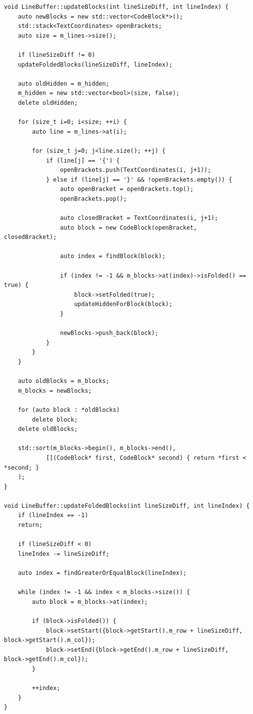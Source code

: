 \documentclass[12pt,oneside]{memoir}
\begin{document}
\begin{verbatim}
void LineBuffer::updateBlocks(int lineSizeDiff, int lineIndex) {
	auto newBlocks = new std::vector<CodeBlock*>();
	std::stack<TextCoordinates> openBrackets;
	auto size = m_lines->size();
	
	if (lineSizeDiff != 0)
	updateFoldedBlocks(lineSizeDiff, lineIndex);
	
	auto oldHidden = m_hidden;
	m_hidden = new std::vector<bool>(size, false);
	delete oldHidden;
	
	for (size_t i=0; i<size; ++i) {
		auto line = m_lines->at(i);
		
		for (size_t j=0; j<line.size(); ++j) {
			if (line[j] == '{') {
  				openBrackets.push(TextCoordinates(i, j+1));
  			} else if (line[j] == '}' && !openBrackets.empty()) {
  				auto openBracket = openBrackets.top();
  				openBrackets.pop();
  				
  				auto closedBracket = TextCoordinates(i, j+1);
  				auto block = new CodeBlock(openBracket, closedBracket);
  				
  				auto index = findBlock(block);
  				
  				if (index != -1 && m_blocks->at(index)->isFolded() == true) {
  					block->setFolded(true);
  					updateHiddenForBlock(block);
  				}
  				
  				newBlocks->push_back(block);
  			}
  		}
  	}
  	
  	auto oldBlocks = m_blocks;
  	m_blocks = newBlocks;
  	
  	for (auto block : *oldBlocks)
  		delete block;
  	delete oldBlocks;
  	
  	std::sort(m_blocks->begin(), m_blocks->end(), 
  			[](CodeBlock* first, CodeBlock* second) { return *first < *second; }
  	);
}

void LineBuffer::updateFoldedBlocks(int lineSizeDiff, int lineIndex) {
	if (lineIndex == -1)
	return;
	
	if (lineSizeDiff < 0)
	lineIndex -= lineSizeDiff;
	
	auto index = findGreaterOrEqualBlock(lineIndex);
	
	while (index != -1 && index < m_blocks->size()) {
		auto block = m_blocks->at(index);
		
		if (block->isFolded()) {
			block->setStart({block->getStart().m_row + lineSizeDiff, block->getStart().m_col});
			block->setEnd({block->getEnd().m_row + lineSizeDiff, block->getEnd().m_col});
		}
		
		++index;
	}
}


\end{verbatim}
\end{document}
